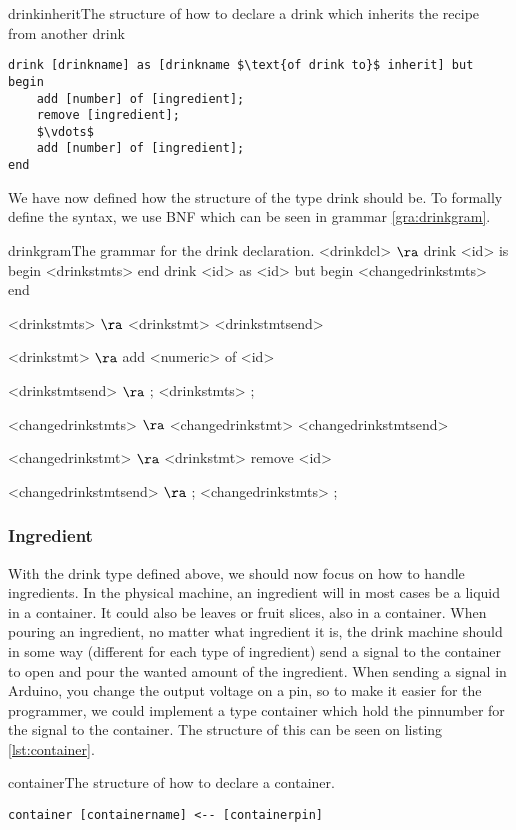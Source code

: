 \begin{code}{drinkinherit}{The structure of how to declare a drink which inherits the recipe from another drink}
\begin{lstlisting}[mathescape]
drink [drinkname] as [drinkname $\text{of drink to}$ inherit] but
begin
	add [number] of [ingredient];
	remove [ingredient];
	$\vdots$
	add [number] of [ingredient];
end
\end{lstlisting}
\end{code}

We have now defined how the structure of the type drink should be. To formally define the syntax, we use BNF which can be seen in grammar \ref{gra:drinkgram}.

\begin{grammatik}{drinkgram}{The grammar for the drink declaration.}
<drinkdcl> $\ra$ drink <id> is begin <drinkstmts> end
\alt drink <id> as <id> but begin <changedrinkstmts> end

<drinkstmts> $\ra$ <drinkstmt> <drinkstmtsend>

<drinkstmt> $\ra$ add <numeric> of <id>

<drinkstmtsend> $\ra$ ; <drinkstmts>
\alt ;

<changedrinkstmts> $\ra$ <changedrinkstmt> <changedrinkstmtsend>

<changedrinkstmt> $\ra$ <drinkstmt>
\alt remove <id>

<changedrinkstmtsend> $\ra$ ; <changedrinkstmts>
\alt ;
\end{grammatik}

\subsubsection{Ingredient}
With the drink type defined above, we should now focus on how to handle ingredients. In the physical machine, an ingredient will in most cases be a liquid in a container. It could also be leaves or fruit slices, also in a container. When pouring an ingredient, no matter what ingredient it is, the drink machine should in some way (different for each type of ingredient) send a signal to the container to open and pour the wanted amount of the ingredient. When sending a signal in Arduino, you change the output voltage on a pin, so to make it easier for the programmer, we could implement a type container which hold the pinnumber for the signal to the container. The structure of this can be seen on listing \ref{lst:container}.

\begin{code}{container}{The structure of how to declare a container.}
\begin{lstlisting}[mathescape]
container [containername] <-- [containerpin]
\end{lstlisting}
\end{code}

